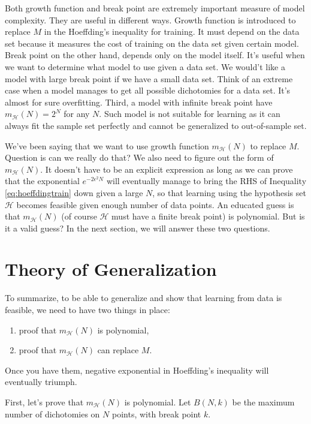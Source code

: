 \documentclass[10pt]{article}
\numberwithin{equation}{section}  %
\begin{document}
Both growth function and break point are extremely important measure of model complexity. They are useful in different ways. Growth function is introduced to replace $M$ in the Hoeffding's inequality for training. It must depend on the data set because it measures the cost of training on the data set given certain model. Break point on the other hand, depends only on the model itself. It's useful when we want to determine what model to use given a data set. We would't like a model with large break point if we have a small data set. Think of an extreme case when a model manages to get all possible dichotomies for a data set. It's almost for sure overfitting. Third, a model with infinite break point have $m_\mathcal{H}(N) = 2^N$ for any $N$. Such model is not suitable for learning as it can always fit the sample set perfectly and cannot be generalized to out-of-sample set.

We've been saying that we want to use growth function $m_\mathcal{H}(N)$ to replace $M$. Question is can we really do that? We also need to figure out the form of $m_\mathcal{H}(N)$. It doesn't have to be an explicit expression as long as we can prove that the exponential $e^{-2\epsilon^2N}$ will eventually manage to bring the RHS of Inequality \eqref{eq:hoeffdingtrain} down given a large $N$, so that learning using the hypothesis set $\mathcal{H}$ becomes feasible given enough number of data points. An educated guess is that $m_\mathcal{H}(N)$ (of course $\mathcal{H}$ must have a finite break point) is polynomial. But is it a valid guess? In the next section, we will answer these two questions.


\section{Theory of Generalization}

To summarize, to be able to generalize and show that learning from data is feasible, we need to have two things in place:
\begin{enumerate}
    \item proof that $m_\mathcal{H}(N)$ is polynomial,
    \item proof that $m_\mathcal{H}(N)$ can replace $M$.
\end{enumerate}
Once you have them, negative exponential in Hoeffding's inequality will eventually triumph.

First, let's prove that $m_\mathcal{H}(N)$ is polynomial. Let $B(N,k)$ be the maximum number of dichotomies on $N$ points, with break point $k$.
\end{document}
